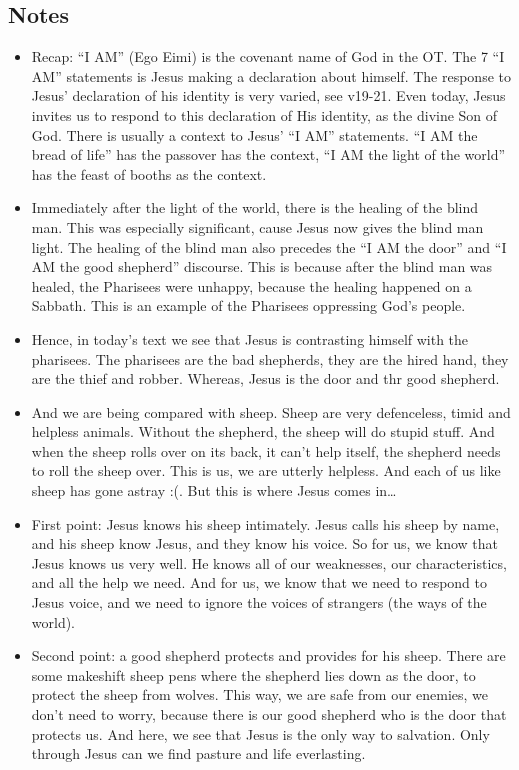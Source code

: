 \subsection*{Notes}
\begin{itemize}
  \item{Recap: “I AM” (Ego Eimi) is the covenant name of God in the OT. The 7 “I AM” statements is Jesus making a declaration about himself. The response to Jesus’ declaration of his identity is very varied, see v19-21. Even today, Jesus invites us to respond to this declaration of His identity, as the divine Son of God. There is usually a context to Jesus’ “I AM” statements. “I AM the bread of life” has the passover has the context, “I AM the light of the world” has the feast of booths as the context.} 
  \item{Immediately after the light of the world, there is the healing of the blind man. This was especially significant, cause Jesus now gives the blind man light. The healing of the blind man also precedes the “I AM the door” and “I AM the good shepherd” discourse. This is because after the blind man was healed, the Pharisees were unhappy, because the healing happened on a Sabbath. This is an example of the Pharisees oppressing God’s people.}
  \item{Hence, in today’s text we see that Jesus is contrasting himself with the pharisees. The pharisees are the bad shepherds, they are the hired hand, they are the thief and robber. Whereas, Jesus is the door and thr good shepherd. }
  \item{And we are being compared with sheep. Sheep are very defenceless, timid and helpless animals. Without the shepherd, the sheep will do stupid stuff. And when the sheep rolls over on its back, it can’t help itself, the shepherd needs to roll the sheep over. This is us, we are utterly helpless. And each of us like sheep has gone astray :(. But this is where Jesus comes in…}
  \item{First point: Jesus knows his sheep intimately. Jesus calls his sheep by name, and his sheep know Jesus, and they know his voice. So for us, we know that Jesus knows us very well. He knows all of our weaknesses, our characteristics, and all the help we need. And for us, we know that we need to respond to Jesus voice, and we need to ignore the voices of strangers (the ways of the world).}
  \item{Second point: a good shepherd protects and provides for his sheep. There are some makeshift sheep pens where the shepherd lies down as the door, to protect the sheep from wolves. This way, we are safe from our enemies, we don’t need to worry, because there is our good shepherd who is the door that protects us. And here, we see that Jesus is the only way to salvation. Only through Jesus can we find pasture and life everlasting. }

\end{itemize}
